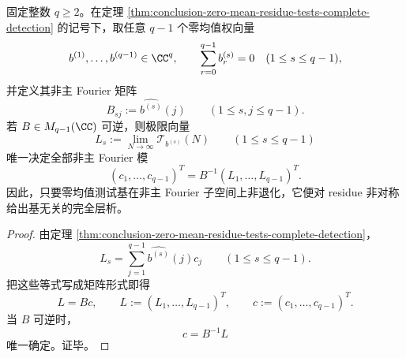\begin{theorem}\label{thm:conclusion-zero-mean-residue-basis-independent-tomography}
固定整数 \(q\ge 2\)。在定理 \ref{thm:conclusion-zero-mean-residue-tests-complete-detection} 的记号下，取任意 \(q-1\) 个零均值权向量
\[
b^{(1)},\dots,b^{(q-1)}\in\CC^q,
\qquad
\sum_{r=0}^{q-1}b_r^{(s)}=0
\quad
(1\le s\le q-1),
\]
并定义其非主 Fourier 矩阵
\[
B_{sj}:=\widehat{b^{(s)}}(j)
\qquad
(1\le s,j\le q-1).
\]
若 \(B\in M_{q-1}(\CC)\) 可逆，则极限向量
\[
L_s:=\lim_{N\to\infty}\mathcal T_{b^{(s)}}(N)
\qquad
(1\le s\le q-1)
\]
唯一决定全部非主 Fourier 模
\[
(c_1,\dots,c_{q-1})^T
=
B^{-1}(L_1,\dots,L_{q-1})^T.
\]
因此，只要零均值测试基在非主 Fourier 子空间上非退化，它便对 residue 非对称给出基无关的完全层析。
\end{theorem}
\begin{proof}
由定理 \ref{thm:conclusion-zero-mean-residue-tests-complete-detection}，
\[
L_s
=
\sum_{j=1}^{q-1}\widehat{b^{(s)}}(j)c_j
\qquad
(1\le s\le q-1).
\]
把这些等式写成矩阵形式即得
\[
L=Bc,
\qquad
L:=(L_1,\dots,L_{q-1})^T,
\qquad
c:=(c_1,\dots,c_{q-1})^T.
\]
当 \(B\) 可逆时，
\[
c=B^{-1}L
\]
唯一确定。证毕。
\end{proof}

